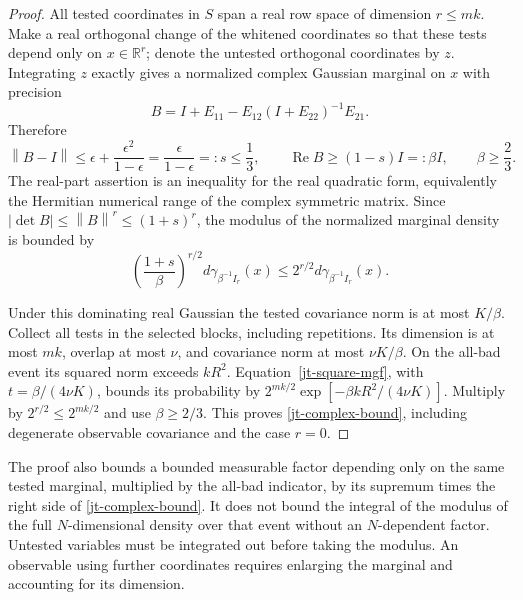 \documentclass[11pt]{article}
\theoremstyle{remark}\newtheorem{remark}[theorem]{Remark}
\newcommand{\norm}[1]{\left\lVert#1\right\rVert}
\begin{document}
\begin{proof}
All tested coordinates in $S$ span a real row space of dimension
$r\le mk$. Make a real orthogonal change of the whitened
coordinates so that these tests depend only on $x\in\mathbb R^r$;
denote the untested orthogonal coordinates by $z$. Integrating
$z$ exactly gives a normalized complex Gaussian marginal on
$x$ with precision
\begin{equation}\label{jt-marginal-precision}
 B=I+E_{11}-E_{12}(I+E_{22})^{-1}E_{21}.
\end{equation}
Therefore
\begin{equation}\label{jt-marginal-control}
 \norm{B-I}\le\epsilon+\frac{\epsilon^2}{1-\epsilon}
       =\frac{\epsilon}{1-\epsilon}=:s\le\frac13,
 \qquad \operatorname{Re}B\ge(1-s)I=:\beta I,
 \qquad \beta\ge\frac23.
\end{equation}
The real-part assertion is an inequality for the real quadratic
form, equivalently the Hermitian numerical range of the complex
symmetric matrix. Since
$|\det B|\le\norm B^r\le(1+s)^r$, the modulus of the
normalized marginal density is bounded by
\begin{equation}\label{jt-marginal-domination}
 \left(\frac{1+s}{\beta}\right)^{r/2}
                d\gamma_{\beta^{-1}I_r}(x)
 \le 2^{r/2}d\gamma_{\beta^{-1}I_r}(x).
\end{equation}

Under this dominating real Gaussian the tested covariance norm
is at most $K/\beta$. Collect all tests in the selected blocks,
including repetitions. Its dimension is at most $mk$, overlap
at most $\nu$, and covariance norm at most $\nu K/\beta$.
On the all-bad event its squared norm exceeds $kR^2$.
Equation~\eqref{jt-square-mgf}, with
$t=\beta/(4\nu K)$, bounds its probability by
$2^{mk/2}\exp[-\beta kR^2/(4\nu K)]$.
Multiply by $2^{r/2}\le2^{mk/2}$ and use $\beta\ge2/3$.
This proves \eqref{jt-complex-bound}, including degenerate
observable covariance and the case $r=0$.
\end{proof}

The proof also bounds a bounded measurable factor depending
only on the same tested marginal, multiplied by the all-bad
indicator, by its supremum times the right side of
\eqref{jt-complex-bound}. It does not bound the integral of
the modulus of the full $N$-dimensional density over that
event without an $N$-dependent factor. Untested variables must
be integrated out before taking the modulus. An observable
using further coordinates requires enlarging the marginal
and accounting for its dimension.
\end{document}
